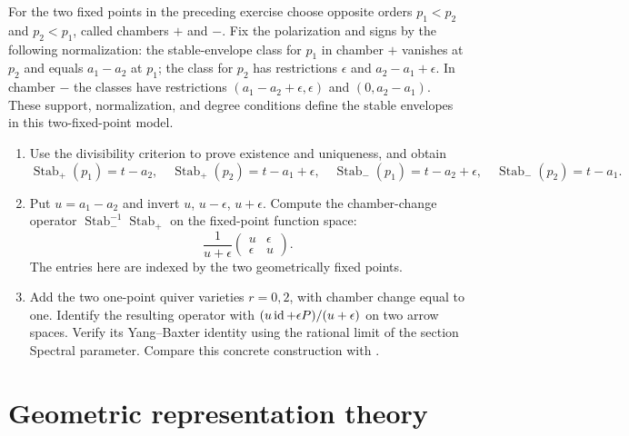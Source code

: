\begin{exercise}
For the two fixed points in the preceding exercise choose opposite
orders $p_1<p_2$ and $p_2<p_1$, called chambers $+$ and $-$.
Fix the polarization and signs by the following normalization:
the stable-envelope class for $p_1$ in chamber $+$ vanishes
at $p_2$ and equals $a_1-a_2$ at $p_1$; the class for $p_2$
has restrictions $\epsilon$ and $a_2-a_1+\epsilon$.
In chamber $-$ the classes have restrictions
$(a_1-a_2+\epsilon,\epsilon)$ and $(0,a_2-a_1)$.
These support, normalization, and degree conditions define the
stable envelopes in this two-fixed-point model.
\begin{enumerate}[label=(\alph*)]
\item Use the divisibility criterion to prove existence and
uniqueness, and obtain
\[
 \operatorname{Stab}_+(p_1)=t-a_2,\quad
 \operatorname{Stab}_+(p_2)=t-a_1+\epsilon,\quad
 \operatorname{Stab}_-(p_1)=t-a_2+\epsilon,\quad
 \operatorname{Stab}_-(p_2)=t-a_1 .
\]
\item Put $u=a_1-a_2$ and invert $u$, $u-\epsilon$,
$u+\epsilon$. Compute the chamber-change operator
$\operatorname{Stab}_-^{-1}\operatorname{Stab}_+$ on the
fixed-point function space:
\[
 \frac1{u+\epsilon}
 \begin{pmatrix}u&\epsilon\\ \epsilon&u\end{pmatrix}.
\]
The entries here are indexed by the two geometrically fixed points.
\item Add the two one-point quiver varieties $r=0,2$, with
chamber change equal to one. Identify the resulting operator
with $(u\operatorname{id}+\epsilon P)/(u+\epsilon)$ on two arrow spaces.
Verify its Yang--Baxter identity using the rational limit of
the section Spectral parameter.
Compare this concrete construction with \cite{maulik-okounkov}.
\end{enumerate}
\end{exercise}

\section{Geometric representation theory}

